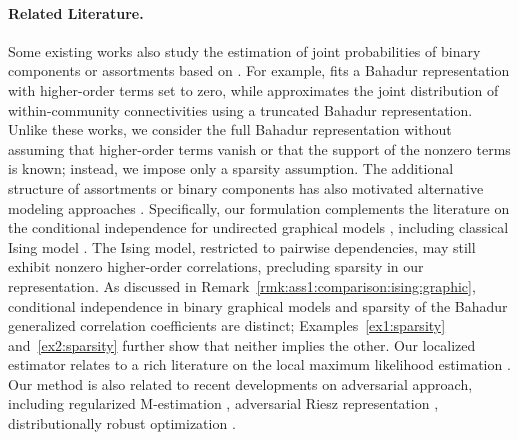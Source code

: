 \documentclass[11pt]{article}
\begin{document}
\paragraph{Related Literature.} 
Some existing works also study the estimation of joint probabilities of binary components or assortments based on \citet{bahadur1959representation}. For example, \citet{sinha2010multivariate} fits a Bahadur representation with higher-order terms set to zero, while \citet{yuan2021community} approximates the joint distribution of within-community connectivities using a truncated Bahadur representation. Unlike these works, we consider the full Bahadur representation without assuming that higher-order terms vanish or that the support of the nonzero terms is known; instead, we impose only a sparsity assumption.
The additional structure of assortments or binary components has also motivated alternative modeling approaches \citep[e.g.][]{banerjee2008model,urschel2017learning,rachkovskij2012similarity,rachkovskij2001representation,rachkovskij2013building,cox1972analysis,rao2004efficiency,gyllenberg1997classification,freund1991unsupervised,ichimura1998maximum}. Specifically, our formulation complements the literature on the conditional independence for undirected graphical models \citep{loh2012structure,morrison2017beyond,van2014new,fan2017high}, including classical Ising model \citep{cipra1987introduction,newell1953theory}. The Ising model, restricted to pairwise dependencies, may still exhibit nonzero higher-order correlations, precluding sparsity in our representation. As discussed in Remark~\ref{rmk:ass1:comparison:ising:graphic}, conditional independence in binary graphical models and sparsity of the Bahadur generalized correlation coefficients \citep{bahadur1959representation} are distinct; Examples~\ref{ex1:sparsity} and~\ref{ex2:sparsity} further show that neither implies the other. Our localized estimator relates to a rich literature on the local maximum likelihood estimation \citep{fan1998local, newey1994kernel, staniswalis1989local, stone1977consistent, tibshirani1987local, lewbel2007local, hansen2008uniform}.  
Our method is also related to recent developments on adversarial approach, including regularized M-estimation \citep{hirshberg2021augmented}, adversarial Riesz representation \citep{chernozhukov2021adversarial}, distributionally robust optimization \citep{blanchet2019quantifying,blanchet2019robust}.
\end{document}
